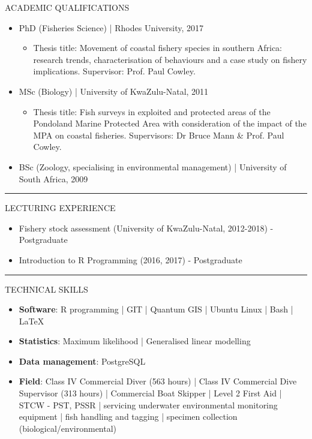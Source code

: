 \documentclass[10pt,a4paper]{article}
\begin{document}

\noindent
ACADEMIC QUALIFICATIONS
	\begin{itemize}
		\setlength\itemsep{0.05em}
		\item PhD (Fisheries Science) | Rhodes University, 2017
		\begin{itemize}
		\setlength\itemsep{0.05em}
			\item Thesis title: Movement of coastal fishery species in southern Africa: research trends, characterisation of behaviours and a case study on fishery implications. Supervisor: Prof. Paul Cowley.
		\end{itemize}
		\item MSc (Biology) | University of KwaZulu-Natal, 2011
		\begin{itemize}
		\setlength\itemsep{0.05em}
			\item Thesis title: Fish surveys in exploited and protected areas of the Pondoland Marine Protected Area with consideration of the impact of the MPA on coastal fisheries. Supervisors: Dr Bruce Mann \& Prof. Paul Cowley.
		\end{itemize}
		\item BSc (Zoology, specialising in environmental management) | University of South Africa, 2009 
	\end{itemize}

\hrule
\vspace{6pt}

\noindent
LECTURING EXPERIENCE
	\begin{itemize}
		\setlength\itemsep{0.05em}
		\item Fishery stock assessment (University of KwaZulu-Natal, 2012-2018) - Postgraduate
		\item Introduction to R Programming (2016, 2017) - Postgraduate
	\end{itemize}

\hrule
\vspace{6pt}
\noindent
TECHNICAL SKILLS
	\begin{itemize}
		\setlength\itemsep{0.05em}
		\item \textbf{Software}: R programming | GIT | Quantum GIS | Ubuntu Linux | Bash | \LaTeX\
		\item \textbf{Statistics}: Maximum likelihood | Generalised linear modelling
		\item \textbf{Data management}: PostgreSQL 
		\item \textbf{Field}: Class IV Commercial Diver (563 hours) | Class IV Commercial Dive Supervisor 
		(313 hours) | Commercial Boat Skipper | Level 2 First Aid | STCW - PST, PSSR | servicing underwater environmental 
		monitoring equipment | fish handling and tagging | specimen collection (biological/environmental)
	\end{itemize}	
\end{document}
